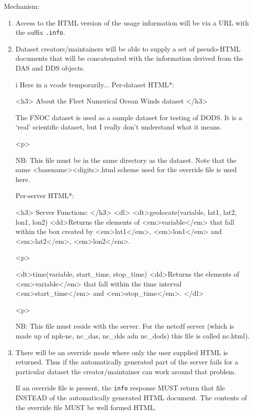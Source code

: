 \documentclass{article}
\begin{document}
Mechanism:
\begin{enumerate}
\item Access to the HTML version of the usage information will be via a URL
  with the suffix \texttt{.info}.
  
\item Dataset creators/maintainers will be able to supply a set
  of pseudo-HTML documents that will be concatenated with the information
  derived from the DAS and DDS objects. 

\begin{vcode}{i}
Here in a vcode temporarily...
Per-dataset HTML*:


    <h3>
    About the Fleet Numerical Ocean Winds dataset
    </h3>

    The FNOC dataset is used as a sample dataset for testing of DODS. It is a
    `real' scientific dataset, but I really don't understand what it means.

    <p>

NB: This file must be in the same directory as the dataset. Note that the
same <basename><digits>.html scheme used for the override file is used
here.

Per-server HTML*:

    <h3>
    Server Functions:
    </h3>
    <dl>
    <dt>geolocate(variable, lat1, lat2, lon1, lon2)
    <dd>Returns the elements of <em>variable</em> that fall within the box
    created by <em>lat1</em>, <em>lon1</em> and <em>lat2</em>, <em>lon2</em>.

    <p>

    <dt>time(variable, start\_time, stop\_time)
    <dd>Returns the elements of <em>variable</em> that fall within the time
    interval <em>start\_time</em> and <em>stop\_time</em>.
    </dl>

    <p>

NB: This file must reside with the server. For the netcdf server (which is
made up of nph-nc, nc\_das, nc\_dds adn nc\_dods) this file is called nc.html).
\end{vcode}

\item There will be an override mode where only the user supplied HTML is
  returned. Thus if the automatically generated part of the server fails for
  a particular dataset the creator/maintainer can work around that problem.

  If an override file is present, the \texttt{info} response MUST return that
  file INSTEAD of the automatically generated \ac{HTML} document. The
  contents of the override file MUST be well formed \ac{HTML}.


\end{enumerate}
\end{document}
